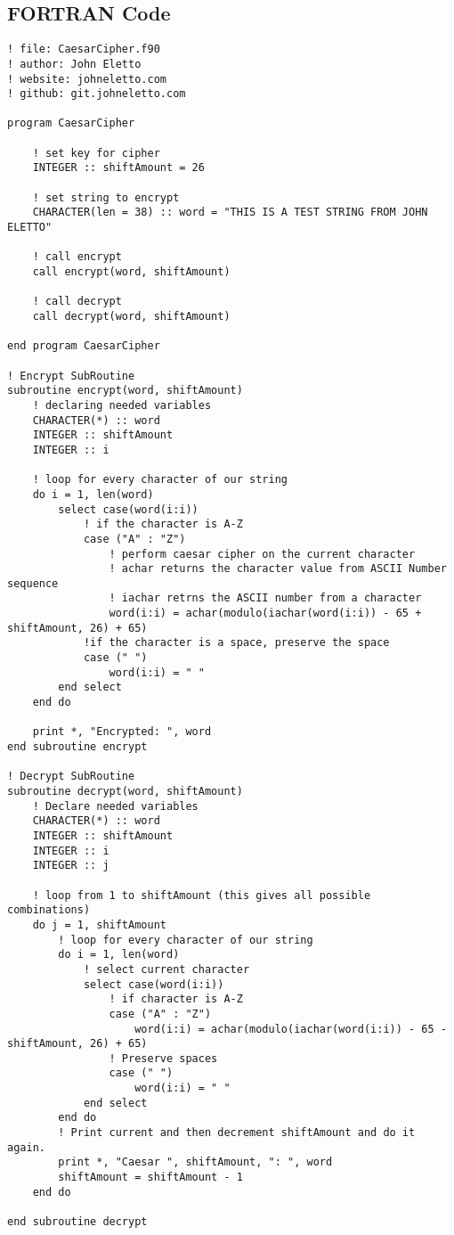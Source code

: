 \documentclass{report}
\begin{document}
\subsection*{FORTRAN Code}
\begin{lstlisting}
! file: CaesarCipher.f90
! author: John Eletto 
! website: johneletto.com
! github: git.johneletto.com

program CaesarCipher

    ! set key for cipher
    INTEGER :: shiftAmount = 26

    ! set string to encrypt
    CHARACTER(len = 38) :: word = "THIS IS A TEST STRING FROM JOHN ELETTO"

    ! call encrypt
    call encrypt(word, shiftAmount)

    ! call decrypt
    call decrypt(word, shiftAmount)

end program CaesarCipher

! Encrypt SubRoutine
subroutine encrypt(word, shiftAmount)
    ! declaring needed variables
    CHARACTER(*) :: word
    INTEGER :: shiftAmount
    INTEGER :: i

    ! loop for every character of our string
    do i = 1, len(word)
        select case(word(i:i))
            ! if the character is A-Z
            case ("A" : "Z")
                ! perform caesar cipher on the current character
                ! achar returns the character value from ASCII Number sequence
                ! iachar retrns the ASCII number from a character
                word(i:i) = achar(modulo(iachar(word(i:i)) - 65 + shiftAmount, 26) + 65)
            !if the character is a space, preserve the space
            case (" ")
                word(i:i) = " "
        end select
    end do

    print *, "Encrypted: ", word
end subroutine encrypt

! Decrypt SubRoutine
subroutine decrypt(word, shiftAmount)
    ! Declare needed variables
    CHARACTER(*) :: word
    INTEGER :: shiftAmount
    INTEGER :: i
    INTEGER :: j

    ! loop from 1 to shiftAmount (this gives all possible combinations)
    do j = 1, shiftAmount
        ! loop for every character of our string
        do i = 1, len(word)
            ! select current character
            select case(word(i:i))
                ! if character is A-Z
                case ("A" : "Z")
                    word(i:i) = achar(modulo(iachar(word(i:i)) - 65 - shiftAmount, 26) + 65)
                ! Preserve spaces
                case (" ")
                    word(i:i) = " "
            end select
        end do
        ! Print current and then decrement shiftAmount and do it again.
        print *, "Caesar ", shiftAmount, ": ", word
        shiftAmount = shiftAmount - 1
    end do
    
end subroutine decrypt
\end{lstlisting}
\end{document}
